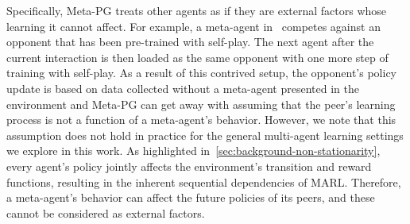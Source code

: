 Specifically, Meta-PG treats other agents as if they are external factors whose learning it cannot affect.
For example, a meta-agent in~\citet{alshedivat2018continuous} competes against an opponent that has been pre-trained with self-play. The next agent after the current interaction is then loaded as the same opponent with one more step of training with self-play. 
As a result of this contrived setup, the opponent's policy update is based on data collected without a meta-agent presented in the environment and Meta-PG can get away with assuming that the peer's learning process is not a function of a meta-agent's behavior.
However, we note that this assumption does not hold in practice for the general multi-agent learning settings we explore in this work. 
As highlighted in~\cref{sec:background-non-stationarity}, every agent's policy jointly affects the environment's transition and reward functions, resulting in the inherent sequential dependencies of MARL. Therefore, a meta-agent's behavior can affect the future policies of its peers, and these cannot be considered as external factors.


